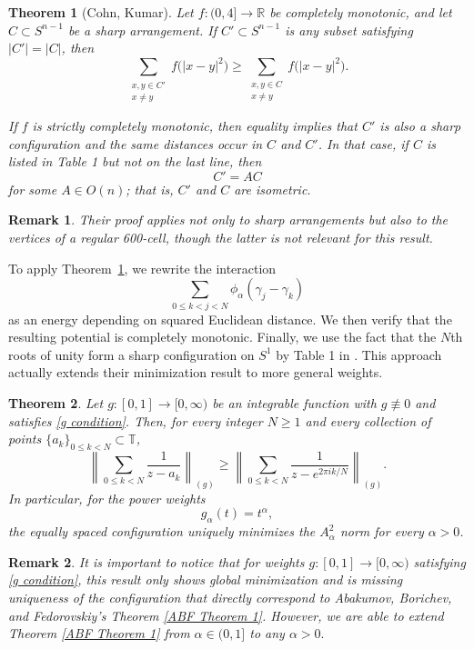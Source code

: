 \documentclass{article}
\newtheorem{theorem}{Theorem}
\newtheorem*{remark}{Remark}
\begin{document}
\begin{theorem}[Cohn, Kumar]\label{cohnkumar theorem}
    Let $f:(0,4]\to\mathbb{R}$ be completely monotonic, and let
$C\subset S^{n-1}$ be a sharp arrangement. If $C'\subset S^{n-1}$ is any subset satisfying $|C'|=|C|$, then
\[
\sum_{\substack{x,y\in C'\\ x\neq y}}
f\bigl(|x-y|^2\bigr)
\geq
\sum_{\substack{x,y\in C\\ x\neq y}}
f\bigl(|x-y|^2\bigr).
\]

If $f$ is strictly completely monotonic, then equality implies that $C'$ is also a sharp configuration and the same distances occur in $C$ and $C'$.  In that case, if $C$ is listed in Table 1 but not on the last line, then
\[
C'=AC
\]
for some $A\in O(n)$; that is, $C'$ and $C$ are isometric.
\end{theorem}

\begin{remark}
    Their proof applies not only to sharp arrangements but also to the vertices of a regular 600-cell, though the latter is not relevant for this result.
\end{remark}
To apply Theorem~\ref{cohnkumar theorem}, we rewrite the interaction
\[
\sum_{0\leq k<j<N}
\phi_\alpha(\gamma_j-\gamma_k)
\]
as an energy depending on squared Euclidean distance. We then verify that the resulting potential is completely monotonic. Finally, we use the fact that the $N$th roots of unity form a sharp configuration on $S^1$ by Table 1 in \cite{cohnKumar2007}. This approach actually extends their minimization result to more general weights.

\begin{theorem}\label{extension theorem}
Let $g:[0,1]\to[0,\infty)$ be an integrable function with
$g\not\equiv0$ and satisfies \eqref{g condition}.
Then, for every integer $N\geq1$ and every collection of points
$\{a_k\}_{0\leq k<N}\subset\mathbb{T}$,
\[
\left\|
\sum_{0\leq k<N}\frac{1}{z-a_k}
\right\|_{(g)}
\geq
\left\|
\sum_{0\leq k<N}
\frac{1}{z-e^{2\pi i k/N}}
\right\|_{(g)}.
\]
In particular, for the power weights
\[
g_\alpha(t)=t^\alpha,
\]
the equally spaced configuration uniquely minimizes the $A^2_\alpha$ norm for every $\alpha>0$.
\end{theorem}


\begin{remark}
    It is important to notice that for weights  $g:[0,1]\to[0,\infty)$ satisfying \eqref{g condition}, this result only shows global minimization and is missing uniqueness of the configuration that directly correspond to Abakumov, Borichev, and Fedorovskiy's Theorem \ref{ABF Theorem 1}. However, we are able to extend Theorem \ref{ABF Theorem 1} from $\alpha\in (0,1]$ to any $\alpha>0.$
\end{remark}
\end{document}
